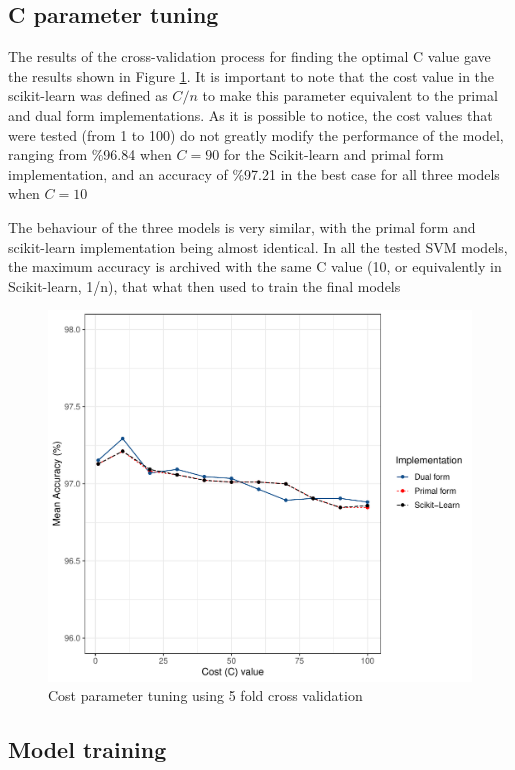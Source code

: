 \documentclass[11pt,twocolumn,letterpaper]{article}
\begin{document}
\subsection{C parameter tuning}

The results of the cross-validation process for finding the optimal C value gave the results shown in Figure \ref{fig:cv_cost}. It is important to note that the cost value in the scikit-learn was defined as $C/n$ to make this parameter equivalent to the primal and dual form implementations. As it is possible to notice, the cost values that were tested (from 1 to 100) do not greatly modify the performance of the model, ranging from \%96.84 when $C = 90$ for the Scikit-learn and primal form implementation, and an accuracy of \%97.21 in the best case for all three models when $C = 10$

The behaviour of the three models is very similar, with the primal form and scikit-learn implementation being almost identical. In all the tested SVM models, the maximum accuracy is archived with the same C value (10, or equivalently in Scikit-learn, 1/n), that what then used to train the final models

\begin{figure}[h]
	\begin{center}
		\includegraphics[width=0.9\linewidth]{CV_cost.pdf}
	\end{center}
	\caption{Cost parameter tuning using 5 fold cross validation}
	\label{fig:cv_cost}
\end{figure}


\subsection{Model training}
\end{document}
